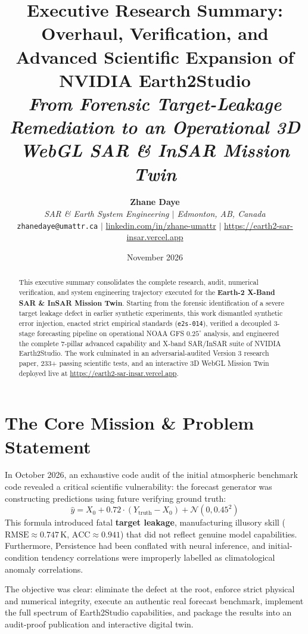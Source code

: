 \documentclass[10pt,twocolumn,a4paper]{article}
\title{\vspace{-1.0cm}\textbf{\Large Executive Research Summary: Overhaul, Verification, and Advanced Scientific Expansion of NVIDIA Earth2Studio}\\
\large\textit{From Forensic Target-Leakage Remediation to an Operational 3D WebGL SAR \& InSAR Mission Twin}}
\author{
    \textbf{Zhane Daye}\\
    \textit{SAR \& Earth System Engineering $|$ Edmonton, AB, Canada}\\
    \texttt{zhanedaye@umattr.ca} \quad $|$ \quad \href{https://www.linkedin.com/in/zhane-umattr}{linkedin.com/in/zhane-umattr} \quad $|$ \quad \url{https://earth2-sar-insar.vercel.app}
}
\date{November 2026}
\begin{document}
\maketitle

\begin{abstract}
\noindent
This executive summary consolidates the complete research, audit, numerical verification, and system engineering trajectory executed for the \textbf{Earth-2 X-Band SAR \& InSAR Mission Twin}. Starting from the forensic identification of a severe target leakage defect in earlier synthetic experiments, this work dismantled synthetic error injection, enacted strict empirical standards (\texttt{e2s-014}), verified a decoupled 3-stage forecasting pipeline on operational NOAA GFS $0.25^\circ$ analysis, and engineered the complete 7-pillar advanced capability and X-band SAR/InSAR suite of NVIDIA Earth2Studio. The work culminated in an adversarial-audited Version 3 research paper, 233+ passing scientific tests, and an interactive 3D WebGL Mission Twin deployed live at \url{https://earth2-sar-insar.vercel.app}.
\end{abstract}

\section{The Core Mission \& Problem Statement}

In October 2026, an exhaustive code audit of the initial atmospheric benchmark code revealed a critical scientific vulnerability: the forecast generator was constructing predictions using future verifying ground truth:
\begin{equation}
\hat{y} = X_0 + 0.72 \cdot (Y_{\text{truth}} - X_0) + \mathcal{N}(0, 0.45^2)
\end{equation}
This formula introduced fatal \textbf{target leakage}, manufacturing illusory skill ($\text{RMSE} \approx 0.747\,\text{K}$, $\text{ACC} \approx 0.941$) that did not reflect genuine model capabilities. Furthermore, Persistence had been conflated with neural inference, and initial-condition tendency correlations were improperly labelled as climatological anomaly correlations.

The objective was clear: eliminate the defect at the root, enforce strict physical and numerical integrity, execute an authentic real forecast benchmark, implement the full spectrum of Earth2Studio capabilities, and package the results into an audit-proof publication and interactive digital twin.
\end{document}
